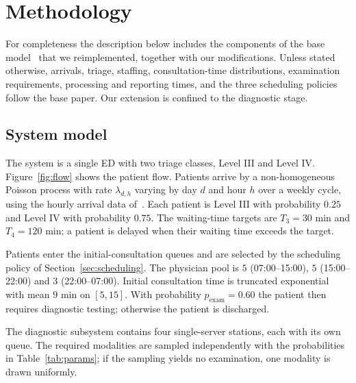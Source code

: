 \documentclass[sigconf]{acmart}
\begin{document}
\section{Methodology}
\label{sec:method}

For completeness the description below includes the components of the base
model~\cite{lv2026des} that we reimplemented, together with our modifications.
Unless stated otherwise, arrivals, triage, staffing, consultation-time
distributions, examination requirements, processing and reporting times, and
the three scheduling policies follow the base paper. Our extension is confined
to the diagnostic stage.

\subsection{System model}
\label{sec:system}

The system is a single ED with two triage classes, Level III and Level IV.
Figure~\ref{fig:flow} shows the patient flow. Patients arrive by a
non-homogeneous Poisson process with rate $\lambda_{d,h}$ varying by day $d$
and hour $h$ over a weekly cycle, using the hourly arrival data
of~\cite{lv2026des}. Each patient is Level III with probability $0.25$ and
Level IV with probability $0.75$. The waiting-time targets are $T_3=30$ min and
$T_4=120$ min; a patient is delayed when their waiting time exceeds the target.

Patients enter the initial-consultation queues and are selected by the
scheduling policy of Section~\ref{sec:scheduling}. The physician pool is $5$
(07:00--15:00), $5$ (15:00--22:00) and $3$ (22:00--07:00). Initial consultation
time is truncated exponential with mean $9$ min on $[5,15]$. With probability
$p_{\mathrm{exam}}=0.60$ the patient then requires diagnostic testing;
otherwise the patient is discharged.

The diagnostic subsystem contains four single-server stations, each with its
own queue. The required modalities are sampled independently with the
probabilities in Table~\ref{tab:params}; if the sampling yields no examination,
one modality is drawn uniformly.
\end{document}
